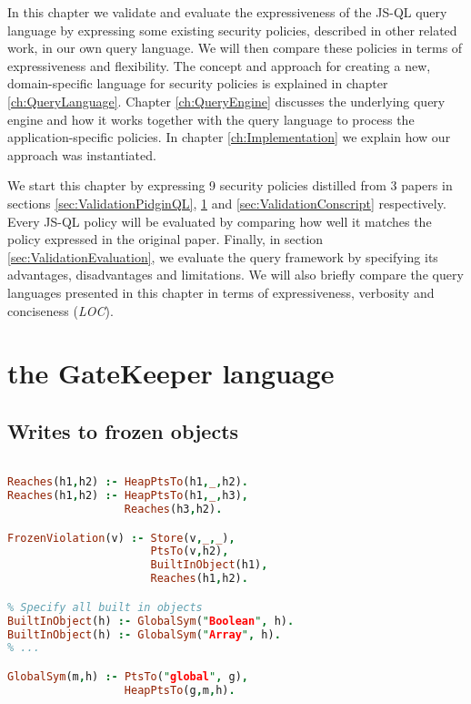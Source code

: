 In this chapter we validate and evaluate the expressiveness of the JS-QL query language by expressing some existing security policies, described in other related work, in our own query language. We will then compare these policies in terms of expressiveness and flexibility. %
The concept and approach for creating a new, domain-specific language for security policies is explained in chapter \ref{ch:QueryLanguage}. Chapter \ref{ch:QueryEngine} discusses the underlying query engine and how it works together with the query language to process the application-specific policies. In chapter \ref{ch:Implementation} we explain how our approach was instantiated.

We start this chapter by expressing 9 security policies distilled from 3 papers in sections \ref{sec:ValidationPidginQL}, \ref{sec:ValidationGK} and \ref{sec:ValidationConscript} respectively. Every JS-QL policy will be evaluated by comparing how well it matches the policy expressed in the original paper. Finally, in section \ref{sec:ValidationEvaluation}, we evaluate the query framework by specifying its advantages, disadvantages and limitations. We will also briefly compare the query languages presented in this chapter in terms of expressiveness, verbosity and conciseness (\textit{LOC}).
\section{the GateKeeper language}
\label{sec:ValidationGK}

\subsection{Writes to frozen objects}

\begin{lstlisting}[label={lst:Policy1GK},language=Prolog,caption=Policy 1 in GateKeeper,mathescape=true]  % float=t?

Reaches(h1,h2) :- HeapPtsTo(h1,_,h2).
Reaches(h1,h2) :- HeapPtsTo(h1,_,h3),
                  Reaches(h3,h2).

FrozenViolation(v) :- Store(v,_,_),
                      PtsTo(v,h2),
                      BuiltInObject(h1),
                      Reaches(h1,h2).

% Specify all built in objects
BuiltInObject(h) :- GlobalSym("Boolean", h).
BuiltInObject(h) :- GlobalSym("Array", h).
% ...

GlobalSym(m,h) :- PtsTo("global", g),
                  HeapPtsTo(g,m,h).

\end{lstlisting}

